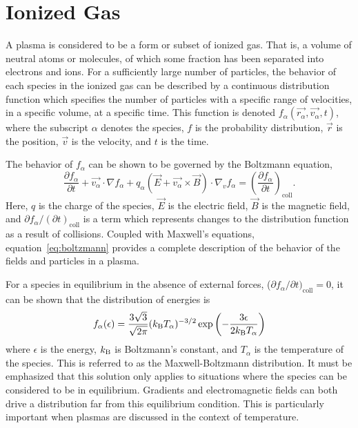 \section{Ionized Gas}
A plasma is considered to be a form or subset of ionized gas. That is, a volume
of neutral atoms or molecules, of which some fraction has been separated into
electrons and ions. For a sufficiently large number of particles, the behavior
of each species in the ionized gas can be described by a continuous distribution
function which specifies the number of particles with a specific range of
velocities, in a specific volume, at a specific time. This function is denoted
$f_\alpha(\vec{r_\alpha}, \vec{v_\alpha}, t)$, where the subscript $\alpha$
denotes the species, $f$ is the probability distribution, $\vec{r}$ is the
position, $\vec{v}$ is the velocity, and $t$ is the time.

The behavior of $f_\alpha$ can be shown to be governed by the Boltzmann
equation,
\begin{equation}\label{eq:boltzmann}
  \frac{\partial f_\alpha}{\partial t} + \vec{v_\alpha}\cdot\nabla f_\alpha +
  q_\alpha \left(\vec{E} + \vec{v_\alpha}\times\vec{B}\right)
  \cdot \nabla_v f_\alpha = \left( \frac{\partial f_\alpha}
  {\partial t}\right)_\mathrm{coll}.
\end{equation}
Here, $q$ is the charge of the species, $\vec{E}$ is the electric field,
$\vec{B}$ is the magnetic field, and $\partial f_\alpha/(\partial
t)_\mathrm{coll}$ is a term which represents changes to the distribution
function as a result of collisions. Coupled with Maxwell's equations,
equation~\ref{eq:boltzmann} provides a complete description of the behavior of
the fields and particles in a plasma.

For a species in equilibrium in the absence of external forces, ($\partial
f_\alpha/\partial t)_\mathrm{coll} = 0$, it can be shown that the distribution
of energies is
\begin{equation}\label{eq:mb}
  f_{\alpha}(\epsilon) = \frac{3\sqrt{3}}{\sqrt{2\pi}}(k_\mathrm{B} T_\alpha)^{-3/2}
                        \exp{\left(-\frac{3\epsilon}{2k_\mathrm{B}T_\alpha}\right)}
\end{equation}
where $\epsilon$ is the energy, $k_\mathrm{B}$ is Boltzmann's constant, and $T_\alpha$ is
the temperature of the species. This is referred to as the Maxwell-Boltzmann
distribution. It must be emphasized that this solution only applies to
situations where the species can be considered to be in equilibrium. Gradients
and electromagnetic fields can both drive a distribution far from this
equilibrium condition. This is particularly important when plasmas are discussed
in the context of temperature.

